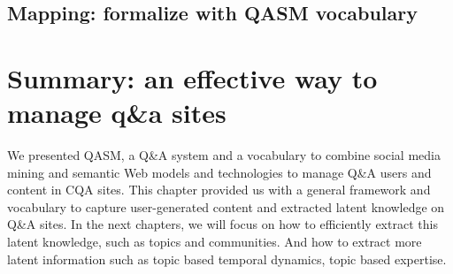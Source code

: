 
\subsection{Mapping: formalize with QASM vocabulary}







\section{Summary: an effective way to manage q\&a sites}
\label{sec:future}
We presented QASM, a Q\&A system and a vocabulary to combine social media mining and semantic Web models and technologies to manage Q\&A users and content in CQA sites. This chapter provided us with a general framework and vocabulary to capture user-generated content and extracted latent knowledge on Q\&A sites. In the next chapters, we will focus on how to efficiently extract this latent knowledge, such as topics and communities. And how to extract more latent information such as topic based temporal dynamics, topic based expertise.





